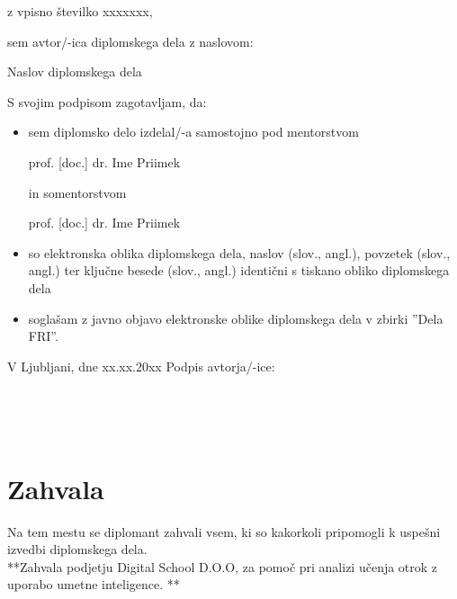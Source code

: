 \documentclass[12pt,a4paper]{book}
\begin{document}
\vspace{0.5cm}
z vpisno številko \hspace{0.5cm} xxxxxxx,

\vspace{1cm}
sem avtor/-ica diplomskega dela z naslovom:
   
\vspace{0.5cm}
Naslov diplomskega dela

\vspace{1.5cm}
S svojim podpisom zagotavljam, da:
\begin{itemize}
	\item sem diplomsko delo izdelal/-a samostojno pod mentorstvom 
	
	prof. [doc.] dr. Ime Priimek
	
	in somentorstvom 
	
	prof. [doc.] dr. Ime Priimek
	
	\item	so elektronska oblika diplomskega dela, naslov (slov., angl.), povzetek (slov., angl.) ter ključne besede (slov., 			angl.) identični s tiskano obliko diplomskega dela
	\item soglašam z javno objavo elektronske oblike diplomskega dela v zbirki ''Dela FRI''.
\end{itemize}

\vspace{1cm}
V Ljubljani, dne xx.xx.20xx \hspace{1cm} Podpis avtorja/-ice:

\newpage 


\ \thispagestyle{empty}

\newpage
\ \thispagestyle{empty}



\chapter*{Zahvala}

\thispagestyle{empty}

Na tem mestu se diplomant zahvali vsem, ki so kakorkoli pripomogli k uspešni izvedbi diplomskega dela.
\\**Zahvala podjetju Digital School D.O.O, za pomoč pri analizi učenja otrok z uporabo umetne inteligence. **
\end{document}
